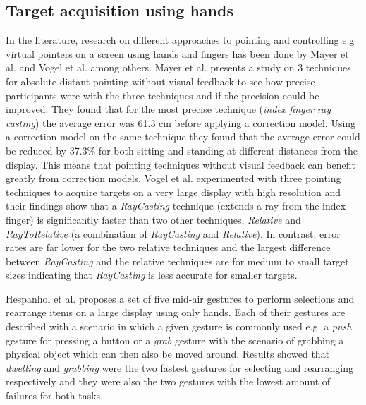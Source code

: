 \subsection{Target acquisition using hands} \label{sec:targetAcquisitionHands}
In the literature, research on different approaches to pointing and controlling e.g virtual pointers on a screen using hands and fingers has been done by Mayer et al. \cite{Mayer:2015} and Vogel et al. \cite{Vogel:2005} among others.
Mayer et al. presents a study on 3 techniques for absolute distant pointing without visual feedback to see how precise participants were with the three techniques and if the precision could be improved.
They found that for the most precise technique (\emph{index finger ray casting}) the average error was 61.3 cm before applying a correction model.
Using a correction model on the same technique they found that the average error could be reduced by 37.3\% for both sitting and standing at different distances from the display.
This means that pointing techniques without visual feedback can benefit greatly from correction models.
Vogel et al. experimented with three pointing techniques to acquire targets on a very large display with high resolution and their findings show that a \emph{RayCasting} technique (extends a ray from the index finger) is significantly faster than two other techniques, \emph{Relative} and \emph{RayToRelative} (a combination of \emph{RayCasting} and \emph{Relative}).
In contrast, error rates are far lower for the two relative techniques and the largest difference between \emph{RayCasting} and the relative techniques are for medium to small target sizes indicating that \emph{RayCasting} is less accurate for smaller targets.

Hespanhol et al. \cite{Hespanhol:2012} proposes a set of five mid-air gestures to perform selections and rearrange items on a large display using only hands.
Each of their gestures are described with a scenario in which a given gesture is commonly used e.g. a \emph{push} gesture for pressing a button or a \emph{grab} gesture with the scenario of grabbing a physical object which can then also be moved around.
Results showed that \emph{dwelling} and \emph{grabbing} were the two fastest gestures for selecting and rearranging respectively and they were also the two gestures with the lowest amount of failures for both tasks.

